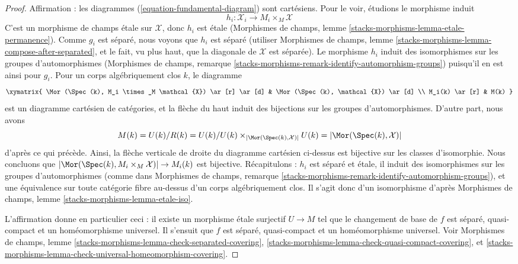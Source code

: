 \begin{proof}
\medskip\noindent
Affirmation : les diagrammes (\ref{equation-fundamental-diagram}) sont cartésiens.
Pour le voir, étudions le morphisme induit
$$
h_i : \mathcal{X}_i \longrightarrow M_i \times_M \mathcal{X}
$$
C'est un morphisme de champs \'etale sur $\mathcal{X}$,
donc $h_i$ est \'etale (Morphismes de champs, lemme
\ref{stacks-morphisms-lemma-etale-permanence}).
Comme $g_i$ est séparé, nous voyons que $h_i$ est séparé
(utiliser Morphismes de champs, lemme
\ref{stacks-morphisms-lemma-compose-after-separated}, et le fait,
vu plus haut, que la diagonale de $\mathcal{X}$ est séparée).
Le morphisme $h_i$ induit des isomorphismes sur les groupes d'automorphismes
(Morphismes de champs, remarque
\ref{stacks-morphisms-remark-identify-automorphism-groups})
puisqu'il en est ainsi pour $g_i$. Pour un corps algébriquement clos $k$,
le diagramme
$$
\xymatrix{
\Mor(\Spec(k), M_i \times_M \mathcal{X}) \ar[r] \ar[d] &
\Mor(\Spec(k), \mathcal{X}) \ar[d] \\
M_i(k) \ar[r] &
M(k)
}
$$
est un diagramme cartésien de catégories, et la flèche du haut
induit des bijections sur les groupes d'automorphismes.
D'autre part, nous avons
$$
M(k) = U(k)/R(k) = U(k)/
U(k) \times_{|\Mor(\Spec(k), \mathcal{X})|} U(k) =
|\Mor(\Spec(k), \mathcal{X})|
$$
d'après ce qui précède. Ainsi, la flèche verticale de droite du
diagramme cartésien ci-dessus est bijective sur les classes d'isomorphie.
Nous concluons que
$|\Mor(\Spec(k), M_i \times_M \mathcal{X})| \to M_i(k)$ est bijective.
Récapitulons : $h_i$ est séparé et \'etale, il induit des isomorphismes sur les
groupes d'automorphismes (comme dans Morphismes de champs, remarque
\ref{stacks-morphisms-remark-identify-automorphism-groups}),
et une équivalence sur toute catégorie fibre au-dessus d'un corps algébriquement clos.
Il s'agit donc d'un isomorphisme d'après Morphismes de champs, lemme
\ref{stacks-morphisms-lemma-etale-iso}.

\medskip\noindent
L'affirmation donne en particulier ceci :
il existe un morphisme \'etale surjectif $U \to M$
tel que le changement de base de $f$ est séparé, quasi-compact
et un homéomorphisme universel. Il s'ensuit que $f$ est séparé,
quasi-compact et un homéomorphisme universel.
Voir Morphismes de champs, lemme
\ref{stacks-morphisms-lemma-check-separated-covering},
\ref{stacks-morphisms-lemma-check-quasi-compact-covering}, et
\ref{stacks-morphisms-lemma-check-universal-homeomorphism-covering}.


\end{proof}
